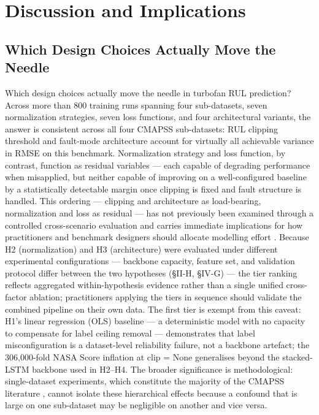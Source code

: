 \documentclass[review,12pt]{elsarticle}
\begin{document}
\section{Discussion and Implications}

\subsection{Which Design Choices Actually Move the Needle}

Which design choices actually move the needle in turbofan RUL prediction? Across more than 800 training runs spanning four sub-datasets, seven normalization strategies, seven loss functions, and four architectural variants, the answer is consistent across all four CMAPSS sub-datasets: RUL clipping threshold and fault-mode architecture account for virtually all achievable variance in RMSE on this benchmark. Normalization strategy and loss function, by contrast, function as residual variables — each capable of degrading performance when misapplied, but neither capable of improving on a well-configured baseline by a statistically detectable margin once clipping is fixed and fault structure is handled. This ordering — clipping and architecture as load-bearing, normalization and loss as residual — has not previously been examined through a controlled cross-scenario evaluation and carries immediate implications for how practitioners and benchmark designers should allocate modelling effort \cite{ref05,ref06}. Because H2 (normalization) and H3 (architecture) were evaluated under different experimental configurations --- backbone capacity, feature set, and validation protocol differ between the two hypotheses (\S{}II-H, \S{}IV-G) --- the tier ranking reflects aggregated within-hypothesis evidence rather than a single unified cross-factor ablation; practitioners applying the tiers in sequence should validate the combined pipeline on their own data. The first tier is exempt from this caveat: H1's linear regression (OLS) baseline --- a deterministic model with no capacity to compensate for label ceiling removal --- demonstrates that label misconfiguration is a dataset-level reliability failure, not a backbone artefact; the 306,000-fold NASA Score inflation at clip = None generalises beyond the stacked-LSTM backbone used in H2--H4. The broader significance is methodological: single-dataset experiments, which constitute the majority of the CMAPSS literature \cite{ref09,ref14,ref15}, cannot isolate these hierarchical effects because a confound that is large on one sub-dataset may be negligible on another and vice versa.
\end{document}
